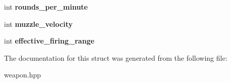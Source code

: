 \begin{DoxyCompactItemize}
int {\bfseries rounds\+\_\+per\+\_\+minute}
\item 
\mbox{\label{structmods_1_1weapon_1_1yaml_1_1rifle__description__t_ac0f8ba564e2a18b13ed05008e8a58304}} 
int {\bfseries muzzle\+\_\+velocity}
\item 
\mbox{\label{structmods_1_1weapon_1_1yaml_1_1rifle__description__t_aebb7a44bc814c19ae41218e3b3888b84}} 
int {\bfseries effective\+\_\+firing\+\_\+range}
\end{DoxyCompactItemize}


The documentation for this struct was generated from the following file\+:\begin{DoxyCompactItemize}
\item 
weapon.\+hpp\end{DoxyCompactItemize}
